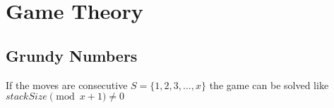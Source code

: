 \section{Game Theory}

\subsection{Grundy Numbers}
If the moves are consecutive $S = \{1, 2, 3,..., x\}$ the game can be solved like $stackSize \pmod{x + 1} \neq 0$ \\

\newpage